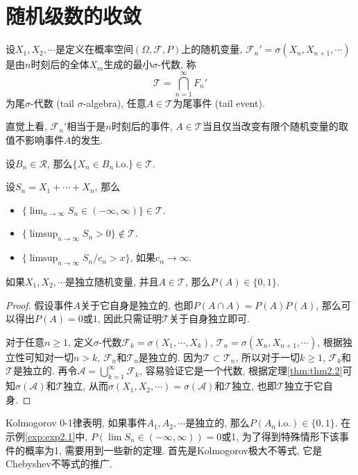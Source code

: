 \documentclass[cn, 12pt, math=mtpro2, bibstyle=apa, blue, twocol]{elegantbook}
\newcommand{\F}{\mathcal{F}}
\newcommand{\limn}{\lim_{n\to\infty}}
\begin{document}
\section{随机级数的收敛}
\begin{definition}
设$X_1,X_2,\cdots$是定义在概率空间$(\Omega,\F,P)$上的随机变量, $\F_n'=\sigma(X_{n},X_{n+1},\cdots)$是由$n$时刻后的全体$X_m$生成的最小$\sigma$-代数, 称
$$\mathcal{T}=\bigcap_{n=1}^\infty F_n'$$
为尾$\sigma$-代数 (tail $\sigma$-algebra), 任意$A\in\mathcal{T}$为尾事件 (tail event).
\end{definition}
直觉上看, $\F_n'$相当于是$n$时刻后的事件, $A\in\mathcal{T}$当且仅当改变有限个随机变量的取值不影响事件$A$的发生.
\begin{example}
设$B_n\in\mathcal{R}$, 那么$\{X_n \in B_n\,\text{i.o.}\}\in\mathcal{T}$.
\end{example}
\begin{example}\label{exp:exp2.1}
设$S_n=X_1+\cdots+X_n$, 那么
\begin{itemize}
  \item $\{\limn S_n\in (-\infty,\infty)\}\in\mathcal{T}$.
  \item $\{\limsup_{n\to\infty} S_n>0\}\notin\mathcal{T}$.
  \item $\{\limsup_{n\to\infty} S_n/c_n>x\}$, 如果$c_n\to\infty$.
\end{itemize}
\end{example}
\begin{theorem}[Kolmogorov 0-1律]
  如果$X_1,X_2,\cdots$是独立随机变量, 并且$A\in\mathcal{T}$, 那么$P(A)\in \{0,1\}$.
\end{theorem}
\begin{proof}
假设事件$A$关于它自身是独立的, 也即$P(A\cap A)=P(A)P(A)$, 那么可以得出$P(A)=0$或$1$, 因此只需证明$\mathcal{T}$关于自身独立即可.

对于任意$n\geq1$, 定义$\sigma$-代数$\F_k=\sigma(X_1,\cdots,X_k)$, $\mathcal{T}_n=\sigma(X_{n},X_{n+1},\cdots)$, 根据独立性可知对一切$n>k$, $\F_n$和$\mathcal{T}_n$是独立的. 因为$\mathcal{T}\subset \mathcal{T}_n$, 所以对于一切$k\geq1$, $\F_k$和$\mathcal{T}$是独立的. 再令$\mathcal{A}=\bigcup_{k=1}^\infty \F_k$, 容易验证它是一个代数, 根据定理\ref{thm:thm2.2}可知$\sigma(\mathcal{A})$和$\mathcal{T}$独立, 从而$\sigma(X_1,X_2,\cdots)=\sigma(\mathcal{A})$和$\mathcal{T}$独立, 也即$\mathcal{T}$独立于它自身.

\end{proof}
Kolmogorov 0-1律表明, 如果事件$A_1,A_2,\cdots$是独立的, 那么$P(A_n\, \text{i.o.})\in\{0,1\}$. 在示例\ref{exp:exp2.1}中, $P(\lim S_n\in (-\infty,\infty))=0$或1, 为了得到特殊情形下该事件的概率为1, 需要用到一些新的定理. 首先是Kolmogorov极大不等式, 它是Chebyshev不等式的推广.
\end{document}
